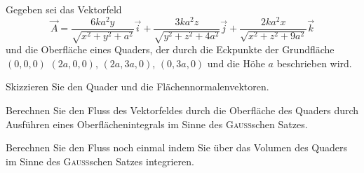 \begin{atiTask}[
  title = Verifikation des GAUSSschen Satzes
]

Gegeben sei das Vektorfeld
\[
\vec{A}=\frac{6ka^2y}{\sqrt{x^2+y^2+a^2}}\vec{i} +\frac{3ka^2z}{\sqrt{y^2+z^2+4a^2}}\vec{j}+\frac{2ka^2x}{\sqrt{x^2+z^2+9a^2}}\vec{k}
\]
und die Oberfläche eines Quaders, der durch die Eckpunkte der Grundfläche $(0,0,0)$ $(2a,0,0)$, $(2a,3a,0)$, $(0,3a,0)$ und die Höhe $a$ beschrieben wird.
\begin{atiSubtasks}
\item Skizzieren Sie den Quader und die Flächennormalenvektoren.
\item Berechnen Sie den Fluss des Vektorfeldes durch die Oberfläche des Quaders durch Ausführen eines Oberflächenintegrals im Sinne des \textsc{Gauss}schen Satzes.
\item Berechnen Sie den Fluss noch einmal indem Sie über das Volumen des Quaders im Sinne des \textsc{Gauss}schen Satzes integrieren.
\end{atiSubtasks}

\end{atiTask}

\begin{atiSolution}

\end{atiSolution}
